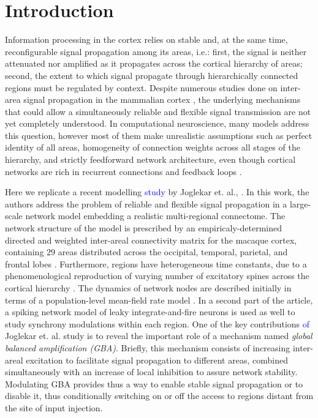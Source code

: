 \setlength{\parindent}{1cm} %

\section{Introduction}\label{introduction}

Information processing in the cortex relies on stable and, at the same time, reconfigurable signal propagation among its areas, i.e.: first, the signal is neither attenuated nor amplified as it propagates across the cortical hierarchy of areas; second, the extent to which signal propagate through hierarchically connected regions must be regulated by context. Despite numerous studies done on inter-area signal propagation in the mammalian cortex \cite{van2002fast, kumar2008conditions,kumar2010spiking}, the underlying mechanisms that could allow a simultaneously reliable and flexible signal transmission are not yet completely understood. In computational neuroscience, many models address this question, however most of them make  unrealistic assumptions such as perfect identity of all areas, homogeneity of connection weights across all stages of the hierarchy, and strictly feedforward network architecture,  even though cortical networks are rich in recurrent connections and feedback loops \cite{markov2014b}.

\indent Here we replicate a recent modelling \textcolor{blue}{study} by Joglekar et. al., \cite{joglekar2018inter}. In this work, the authors address the problem of reliable and flexible signal propagation in a large-scale network model embedding a realistic multi-regional connectome. The network structure of the model is prescribed by an empiricaly-determined directed and weighted inter-areal connectivity matrix for the macaque cortex, containing $29$ areas distributed across the occipital, temporal, parietal, and frontal lobes \cite{markov2014b}. Furthermore, regions have heterogeneous time constants, due to a phenomenological reproduction of varying number of excitatory spines across the cortical hierarchy \cite{Elston2007}. The dynamics of network nodes are described initially in terms of a population-level mean-field rate model \cite{chaudhuri2015large,mejias2016feedforward}. In a second part of the article, a spiking network model of leaky integrate-and-fire neurons is used as well to study synchrony modulations within each region.  One of the key contributions \textcolor{blue}{of} Joglekar et. al. \cite{joglekar2018inter} study is to reveal the important role of a mechanism named \emph{global balanced amplification (GBA)}. Briefly, this mechanism consists of increasing inter-areal excitation to facilitate signal propagation to different areas, combined simultaneously with an increase of local inhibition to assure network stability. Modulating GBA provides thus a way to enable stable signal propagation or to disable it, thus conditionally switching on or off the access to regions distant from the site of input injection.

